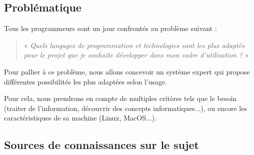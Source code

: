\documentclass[a4paper,12pt]{article}
\begin{document}
\subsection{Problématique}

Tous les programmeurs sont un jour confrontés au problème suivant :

\begin{quotation}
\centering
« \textit{Quels langages de programmation et technologies sont les plus adaptés pour le projet que je souhaite développer dans mon cadre d'utilisation ?} »

\end{quotation}


    Pour pallier à ce problème, nous allons concevoir un système expert qui propose différentes possibilités les plus adaptées selon l'usage.

    Pour cela, nous prendrons en compte de multiples critères tels que le besoin (traiter de l'information, découvrir des concepts informatiques...), ou encore les caractéristiques de sa machine (Linux, MacOS...).

\subsection{Sources de connaissances sur le sujet}
\end{document}
